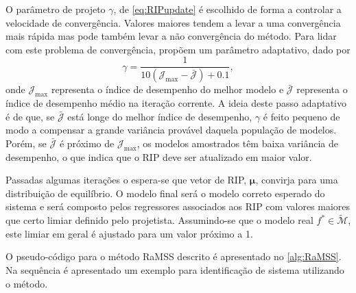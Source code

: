 O parâmetro de projeto $\gamma$, de  \eqref{eq:RIPupdate} é escolhido de forma a controlar a velocidade de convergência. Valores maiores tendem a levar a uma convergência mais rápida mas pode também levar a não convergência do método. Para lidar com este problema de convergência, \cite{falsone2015} propõem um parâmetro adaptativo, dado por
\begin{equation}
   \gamma = \frac{1}{10(\mathcal{J}_{\max}- \bar{\mathcal{J}}) + 0.1}, 
\label{eq:gamma}
\end{equation}
onde $\mathcal{J}_{\max}$ representa o índice de desempenho do melhor modelo e $\bar{\mathcal{J}}$ representa o índice de desempenho médio na iteração corrente.
A ideia deste passo adaptativo é de que, se $\bar{\mathcal{J}}$ está longe do melhor índice de desempenho, $\gamma$ é feito pequeno de modo a compensar a grande variância provável daquela população de modelos. Porém, se  $\bar{\mathcal{J}}$ é próximo de $\mathcal{J}_{\max}$, os modelos amostrados têm baixa variância de desempenho, o que indica que o RIP deve ser atualizado em maior valor.


Passadas algumas iterações o espera-se que vetor de RIP, $\bm{\mu}$, convirja para uma distribuição de equilíbrio. O modelo final será o modelo correto esperado do sistema e será composto pelos regressores associados aos RIP com valores maiores que certo limiar definido pelo projetista. Assumindo-se que o modelo real $f^* \in \tilde{\mathscr{M}}$, este limiar em geral é ajustado para um valor próximo a 1.

O pseudo-código para o método RaMSS descrito é apresentado no \autoref{alg:RaMSS}. Na sequência é apresentado  um exemplo para identificação de sistema utilizando o  método.

